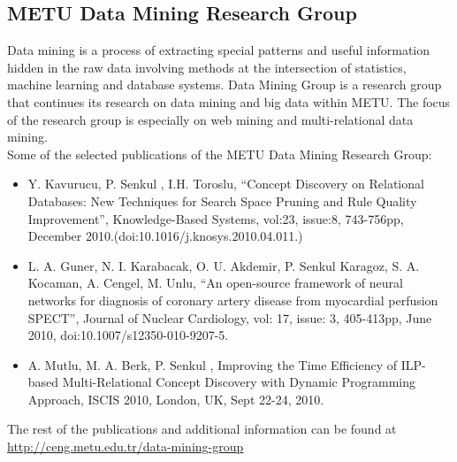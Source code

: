 \subsection{METU Data Mining Research Group}
Data mining is a process of extracting special patterns and useful information hidden in the raw data involving methods at the intersection of statistics, machine learning and database systems.
Data Mining Group is a research group that continues its research on data mining and big data within METU.
The focus of the research group is especially on web mining and multi-relational data mining.\\

Some of the selected publications of the METU Data Mining Research Group:
\begin{itemize}
\item Y. Kavurucu, P. Senkul , I.H. Toroslu, “Concept Discovery on Relational Databases: New Techniques for Search Space Pruning and Rule Quality Improvement”, Knowledge-Based Systems, vol:23, issue:8, 743-756pp, December 2010.(doi:10.1016/j.knosys.2010.04.011.)
\item L. A. Guner, N. I. Karabacak, O. U. Akdemir, P. Senkul Karagoz, S. A. Kocaman, A. Cengel, M. Unlu, “An open-source framework of neural networks for diagnosis of coronary artery disease from myocardial perfusion SPECT”, Journal of Nuclear Cardiology, vol: 17, issue: 3, 405-413pp, June 2010, doi:10.1007/s12350-010-9207-5.
\item A. Mutlu, M. A. Berk, P. Senkul , Improving the Time Efficiency of ILP-based Multi-Relational Concept Discovery with Dynamic Programming Approach, ISCIS 2010, London, UK, Sept 22-24, 2010.
\end{itemize}
The rest of the publications and additional information can be found at \url{http://ceng.metu.edu.tr/data-mining-group}